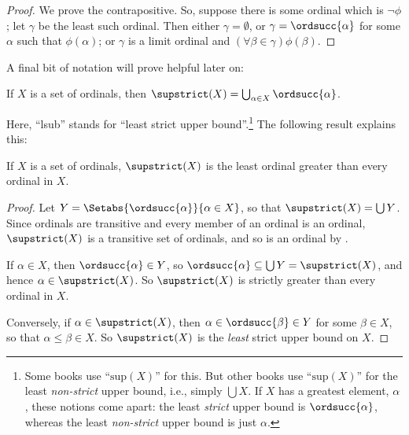 \documentclass[../../../include/open-logic-section]{subfiles}
\begin{document}
\begin{proof}
We prove the contrapositive. So, suppose there is some ordinal which
is $\lnot\phi$; let $\gamma$ be the least such ordinal. Then either
$\gamma = \emptyset$, or $\gamma = \ordsucc{\alpha}$ for some $\alpha$
such that $\phi(\alpha)$; or $\gamma$ is a limit ordinal and $(\forall
\beta \in \gamma)\phi(\beta)$.
\end{proof}
\noindent
A final bit of notation will prove helpful later on:

\begin{defn}
If $X$ is a  set of ordinals, then $\supstrict(X) = \bigcup_{\alpha
\in X} \ordsucc{\alpha}$.
\end{defn}
\noindent
Here, ``lsub'' stands for ``least strict upper bound''.\footnote{Some
books use ``$\text{sup}(X)$'' for this.  But other books use
``$\text{sup}(X)$'' for the least \emph{non-strict} upper bound, i.e.,
simply $\bigcup X$. If $X$ has a greatest element, $\alpha$, these
notions come apart: the least \emph{strict} upper bound is
$\ordsucc{\alpha}$, whereas the least \emph{non-strict} upper bound is
just $\alpha$.}  The following result explains this:

\begin{prop}
If $X$ is a set of ordinals, $\supstrict(X)$ is the least ordinal
greater than every ordinal in $X$.
\end{prop}

\begin{proof}
Let $Y = \Setabs{\ordsucc{\alpha}}{\alpha \in X}$, so that
$\supstrict(X) = \bigcup Y$. Since ordinals are transitive and every
member of an ordinal is an ordinal, $\supstrict(X)$ is a transitive
set of ordinals, and so is an ordinal by
. 

If $\alpha \in X$, then $\ordsucc{\alpha} \in Y$, so $\ordsucc{\alpha}
\subseteq \bigcup Y = \supstrict(X)$, and hence $\alpha \in
\supstrict(X)$. So $\supstrict(X)$ is strictly greater than every
ordinal in $X$.

Conversely, if $\alpha \in \supstrict(X)$, then $\alpha \in
\ordsucc{\beta} \in Y$ for some $\beta \in X$, so that $\alpha \leq
\beta \in X$. So $\supstrict(X)$ is the \emph{least} strict upper
bound on $X$.
\end{proof}
\end{document}
